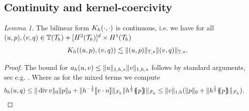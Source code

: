 \documentclass[pdflatex,sn-mathphys,Numbered]{sn-jnl}%
\theoremstyle{remark}%
\newtheorem{lemma}[theorem]{Lemma}
\theoremstyle{definition}%
\begin{document}
\subsection{Continuity and kernel-coercivity}
\begin{lemma}
  The bilinear form $K_h(\cdot,\cdot)$ is continuous, i.e.
    we have for all $(u,p), (v,q) \in \mathbb{T}({\mathcal{T}_h}) + [H^{2}({\mathcal{T}_h})]^d \times H^1({\mathcal{T}_h})$
    \begin{align} \label{eq:Khcontinuity}
        K_h((u,p),(v,q)) \lesssim \Vert (u,p) \Vert_{\mathbb{T},\ast} \Vert (v,q) \Vert_{\mathbb{T}, \ast}.
    \end{align}
\end{lemma}
\begin{proof}
    The bound for $ a_h(u,v)\leq \Vert u \Vert_{1,h,*} \Vert v \Vert_{1,h,*} $ follows by standard arguments, see e.g. \cite[Lemma 4.16]{di2011mathematical}.
    Where as for the mixed terms we compute
    \begin{align*}
        b_h&(u,q) \leq \nrm{\Div v}_{0} \nrm{p}_{0} + \nrm{h^{-\frac12}\jmp{v\cdot n}}_{\Fh} \nrm{h^{\frac12}\avg{p}}_{\Fh} 
        \leq \nrm{v}_{1,h} (\nrm{p}_{0} + \nrm{h^{\frac12}\avg{p}}_{\Fh} ).
    \end{align*}

\end{proof}
\end{document}
